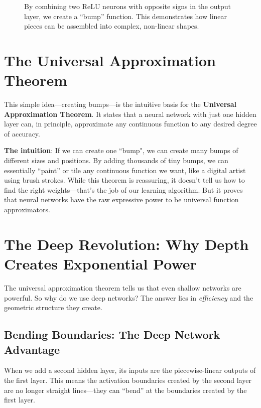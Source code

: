 \documentclass[11pt]{article}
\begin{document}
\begin{figure}[h!]
\caption{By combining two ReLU neurons with opposite signs in the output layer, we create a ``bump'' function. This demonstrates how linear pieces can be assembled into complex, non-linear shapes.}
\label{fig:bump}
\end{figure}

\section{The Universal Approximation Theorem}
This simple idea—creating bumps—is the intuitive basis for the \textbf{Universal Approximation Theorem}. It states that a neural network with just one hidden layer can, in principle, approximate any continuous function to any desired degree of accuracy.

\textbf{The intuition}: If we can create one ``bump", we can create many bumps of different sizes and positions. By adding thousands of tiny bumps, we can essentially ``paint'' or tile any continuous function we want, like a digital artist using brush strokes. While this theorem is reassuring, it doesn't tell us how to find the right weights—that's the job of our learning algorithm. But it proves that neural networks have the raw expressive power to be universal function approximators.

\section{The Deep Revolution: Why Depth Creates Exponential Power}
The universal approximation theorem tells us that even shallow networks are powerful. So why do we use deep networks? The answer lies in \emph{efficiency} and the geometric structure they create.

\subsection{Bending Boundaries: The Deep Network Advantage}
When we add a second hidden layer, its inputs are the piecewise-linear outputs of the first layer. This means the activation boundaries created by the second layer are no longer straight lines—they can ``bend'' at the boundaries created by the first layer.
\end{document}
